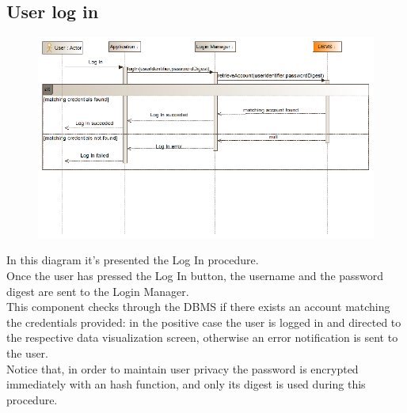 \subsection{User log in}
\begin{figure}[H]
\centering
\includegraphics[width=\linewidth]{resources/uml/sequence/LogIn.png}
\end{figure}
In this diagram it's presented the Log In procedure.\\
Once the user has pressed the Log In button, the username and the password digest are sent to the Login Manager.\\
This component checks through the DBMS if there exists an account matching the credentials provided: in the positive case the user is logged in and directed to the respective data visualization screen, otherwise an error notification is sent to the user.\\
Notice that, in order to maintain user privacy the password is encrypted immediately with an hash function, and only its digest is used during this procedure.


